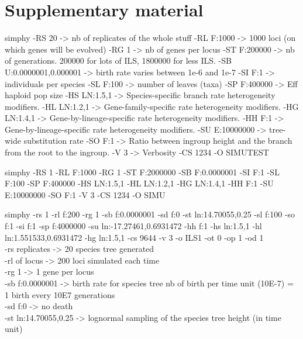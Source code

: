 \section*{Supplementary material}



simphy 
-RS 20 -> nb of replicates of the whole stuff
-RL F:1000 -> 1000 loci (on which genes will be evolved)
-RG 1 -> nb of genes per locus
-ST F:200000 -> nb of generations. 200000 for lots of ILS, 1800000 for less ILS. 
-SB U:0.0000001,0.000001 -> birth rate varies between 1e-6 and 1e-7
-SI F:1 -> individuals per species 
-SL F:100 -> number of leaves (taxa)
-SP F:400000 -> Eff haploid pop size
-HS LN:1.5,1 -> Species-specific branch rate heterogeneity modifiers.
-HL LN:1.2,1 -> Gene-family-specific rate heterogeneity modifiers.
-HG LN:1.4,1 -> Gene-by-lineage-specific rate heterogeneity modifiers.
-HH F:1 -> Gene-by-lineage-specific rate heterogeneity modifiers.
-SU E:10000000 -> tree-wide substitution rate
-SO F:1 -> Ratio between ingroup height and the branch from the root to the ingroup.
-V 3 -> Verbosity
-CS 1234
-O SIMUTEST

simphy -RS 1 -RL F:1000 -RG 1 -ST F:2000000 -SB F:0.0000001 -SI F:1 -SL F:100 -SP F:400000 -HS LN:1.5,1 -HL LN:1.2,1 -HG LN:1.4,1 -HH F:1 -SU E:10000000 -SO F:1 -V 3 -CS 1234 -O SIMU




simphy -rs 1 -rl f:200 -rg 1 
-sb f:0.0000001 -sd f:0 -st ln:14.70055,0.25 -sl f:100 -so f:1 -si f:1 -sp f:4000000 -su ln:-17.27461,0.6931472 
-hh f:1 -hs ln:1.5,1 -hl ln:1.551533,0.6931472 -hg ln:1.5,1 -cs 9644 -v 3 -o ILS1 -ot 0 -op 1 -od 1 \\


-rs replicates -> 20 species tree generated \\
-rl of locus -> 200 loci simulated each time \\
-rg 1 -> 1 gene per locus \\
-sb f:0.0000001 -> birth rate for species tree nb of birth per time unit (10E-7) = 1 birth every 10E7 generations \\
-sd f:0 -> no death \\
-st ln:14.70055,0.25 -> lognormal sampling of the species tree height (in time unit)
